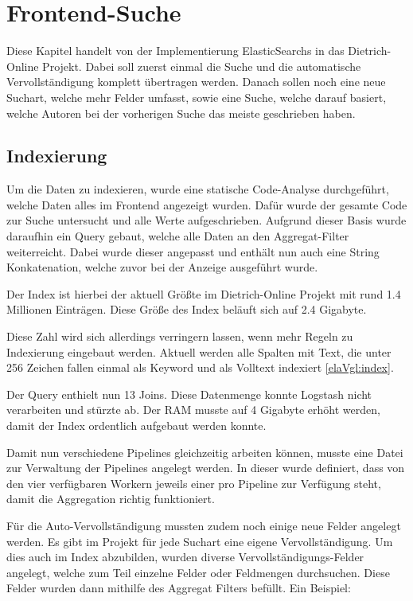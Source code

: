 \chapter{Frontend-Suche}

Diese Kapitel handelt von der Implementierung ElasticSearchs in das Dietrich-Online Projekt. Dabei soll zuerst einmal die Suche und die automatische Vervollständigung komplett übertragen werden. Danach sollen noch eine neue Suchart, welche mehr Felder umfasst, sowie eine Suche, welche darauf basiert, welche Autoren bei der vorherigen Suche das meiste geschrieben haben.

\section{Indexierung}

Um die Daten zu indexieren, wurde eine statische Code-Analyse durchgeführt, welche Daten alles im Frontend angezeigt wurden. Dafür wurde der gesamte Code zur Suche untersucht und alle Werte aufgeschrieben. Aufgrund dieser Basis wurde daraufhin ein Query gebaut, welche alle Daten an den Aggregat-Filter weiterreicht. Dabei wurde dieser angepasst und enthält nun auch eine String Konkatenation, welche zuvor bei der Anzeige ausgeführt wurde.

Der Index ist hierbei der aktuell Größte im Dietrich-Online Projekt mit rund 1.4 Millionen Einträgen. Diese Größe des Index beläuft sich auf 2.4 Gigabyte.

Diese Zahl wird sich allerdings verringern lassen, wenn mehr Regeln zu Indexierung eingebaut werden. Aktuell werden alle Spalten mit Text, die unter 256 Zeichen fallen einmal als Keyword und als Volltext indexiert \ref{elaVgl:index}.

Der Query enthielt nun 13 Joins. Diese Datenmenge konnte Logstash nicht verarbeiten und stürzte ab. Der RAM musste auf 4 Gigabyte erhöht werden, damit der Index ordentlich aufgebaut werden konnte.

Damit nun verschiedene Pipelines gleichzeitig arbeiten können, musste eine Datei zur Verwaltung der Pipelines angelegt werden. In dieser wurde definiert, dass von den vier verfügbaren Workern jeweils einer pro Pipeline zur Verfügung steht, damit die Aggregation richtig funktioniert.

Für die Auto-Vervollständigung mussten zudem noch einige neue Felder angelegt werden. Es gibt im Projekt für jede Suchart eine eigene Vervollständigung. Um dies auch im Index abzubilden, wurden diverse Vervollständigungs-Felder angelegt, welche zum Teil einzelne Felder oder Feldmengen durchsuchen. Diese Felder wurden dann mithilfe des Aggregat Filters befüllt. Ein Beispiel:

